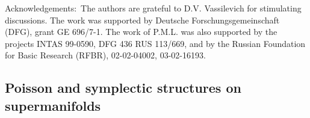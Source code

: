 \documentclass[a4paper,11pt]{article}
\begin{document}
{\sc Acknowledgements:}~The authors are grateful to D.V. Vassilevich for
stimulating discussions. The work was supported by Deutsche
Forschungsgemeinschaft (DFG), grant GE 696/7-1. The work of P.M.L. was also
supported by the projects INTAS 99-0590, DFG 436 RUS 113/669, and by the
Russian Foundation for Basic Research (RFBR), 02-02-04002, 03-02-16193.


\begin{appendix}

\section{Poisson and symplectic structures on supermanifolds}
\renewcommand{\theequation}{\thesection.\arabic{equation}}
\setcounter{equation}{0}
\hspace*{\parindent}


\end{appendix}
\end{document}
